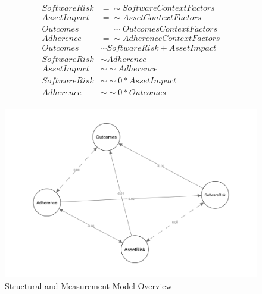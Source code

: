  \begin{equation} \label{eq:1}
 \begin{split}
 SoftwareRisk &=\sim SoftwareContextFactors\\
 AssetImpact &=\sim AssetContextFactors\\
 Outcomes &=\sim OutcomesContextFactors\\ 
 Adherence &=\sim AdherenceContextFactors\\
 Outcomes &\sim SoftwareRisk + AssetImpact\\
 SoftwareRisk &\sim Adherence\\
 AssetImpact &\sim\sim  Adherence\\
 SoftwareRisk &\sim\sim 0*AssetImpact\\
 Adherence &\sim\sim 0*Outcomes\\
 \end{split}
 \end{equation}
 
 \begin{figure}
 	\includegraphics[width=\columnwidth]{modelzeroB.png}
 	\caption{Structural and Measurement Model Overview}
 	\label{fig:model_constructs}
 \end{figure}
  
